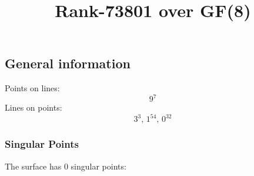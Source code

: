 \documentclass{article}
\newcommand\setTBstruts{\def\T{\rule{0pt}{2.6ex}}%
\def\B{\rule[-1.2ex]{0pt}{0pt}}}
\begin{document}
 
\setTBstruts



{\allowdisplaybreaks%






\title{Rank-73801 over GF(8)}
\author{}%
\maketitle%
%
{}



\subsection*{General information}
Points on lines:
$$
9^7$$
Lines on points:
$$
3^3,\,1^{54},\,0^{32}$$
\subsubsection*{Singular Points}
The surface has 0 singular points:\\
\begin{align*}
\end{align*}
}
\end{document}
